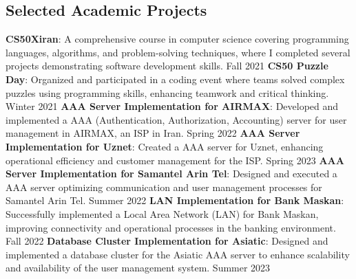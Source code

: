 \documentclass[../main.tex]{subfiles}
\begin{document}
\begin{category}
\section{Selected Academic Projects}
	\citembullet \textbf{CS50Xiran}: A comprehensive course in computer science covering programming languages, algorithms, and problem-solving techniques, where I completed several projects demonstrating software development skills. \hfill Fall 2021
    \citembullet \textbf{CS50 Puzzle Day}: Organized and participated in a coding event where teams solved complex puzzles using programming skills, enhancing teamwork and critical thinking. \hfill Winter 2021
    \citembullet \textbf{AAA Server Implementation for AIRMAX}: Developed and implemented a AAA (Authentication, Authorization, Accounting) server for user management in AIRMAX, an ISP in Iran. \hfill Spring 2022
    \citembullet \textbf{AAA Server Implementation for Uznet}: Created a AAA server for Uznet, enhancing operational efficiency and customer management for the ISP. \hfill Spring 2023
    \citembullet \textbf{AAA Server Implementation for Samantel Arin Tel}: Designed and executed a AAA server optimizing communication and user management processes for Samantel Arin Tel. \hfill Summer 2022
    \citembullet \textbf{LAN Implementation for Bank Maskan}: Successfully implemented a Local Area Network (LAN) for Bank Maskan, improving connectivity and operational processes in the banking environment. \hfill Fall 2022
    \citembullet \textbf{Database Cluster Implementation for Asiatic}: Designed and implemented a database cluster for the Asiatic AAA server to enhance scalability and availability of the user management system. \hfill Summer 2023
    \\[-12pt]
\end{category}
\end{document}
